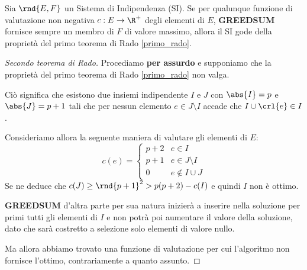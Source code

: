 \documentclass[\main/main.tex]{subfiles}
\begin{document}
\begin{theorem}
  Sia \(\rnd{E, F}\) un Sistema di Indipendenza (SI). Se per qualunque funzione di valutazione non negativa \(c: E \rightarrow \R^+\) degli elementi di \(E\), \textbf{GREEDSUM} fornisce sempre un membro di \(F\) di valore massimo, allora il SI gode della proprietà del primo teorema di Rado \ref{primo_rado}.
\end{theorem}
\begin{proof}[Secondo teorema di Rado]
  Procediamo \textbf{per assurdo} e supponiamo che la proprietà del primo teorema di Rado \ref{primo_rado} non valga.

  Ciò significa che esistono due insiemi indipendente \(I\) e \(J\) con \(\abs{I} = p\) e \(\abs{J} = p+1\) tali che per nessun elemento \(e \in J \setminus I\) accade che \(I \cup \crl{e} \in I\).

  Consideriamo allora la seguente maniera di valutare gli elementi di \(E\):
  \[
    c(e) = \begin{cases}
      p+2 & e \in I            \\
      p+1 & e \in J\setminus I \\
      0   & e \not\in I \cup J
    \end{cases}
  \]
  Se ne deduce che \(c(J) \geq \rnd{p+1}^2 > p(p+2) - c(I)\) e quindi \(I\) non è ottimo.

  \textbf{GREEDSUM} d'altra parte per sua natura inizierà a inserire nella soluzione per primi tutti gli elementi di \(I\) e non potrà poi aumentare il valore della soluzione, dato che sarà costretto a selezione solo elementi di valore nullo.

  Ma allora abbiamo trovato una funzione di valutazione per cui l'algoritmo non fornisce l'ottimo, contrariamente a quanto assunto.
\end{proof}
\end{document}
